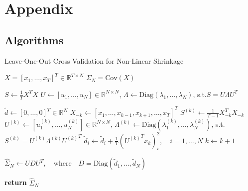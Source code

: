 \documentclass{article}
\begin{document}



\section{Appendix}

\subsection{Algorithms}


\begin{algorithm}
	\caption{Leave-One-Out Cross Validation for Non-Linear Shrinkage}
	\label{alg:nls_loo}
	\begin{algorithmic}[1]
	\Require $X = [x_1, \ldots, x_T]^T \in \mathbb{R}^{T\times N}$
	\Require $\Sigma_N = \mathrm{Cov}(X)$

		\State $S \gets \frac1T X^T X$
		\State 
				$U \gets [u_1, \ldots, u_N] \in \mathbb{R}^{N\times N}$,
				\quad $\Lambda \gets \mathrm{Diag}(\lambda_1, \ldots, \lambda_N)$,
				\quad \mbox{s.t.}\quad $S = U \Lambda {U}^T$

		\State $\tilde{d} \gets [0, \ldots, 0]^T \in \mathbb{R}^{N}$
			\State $X_{-k} \gets [x_1, \ldots, x_{k-1}, x_{k+1}, \ldots, x_T]^T$
			\State $S^{(k)} \gets \frac{1}{T-1} X_{-k}^T X_{-k} $
			\State 
				$U^{(k)} \gets [u^{(k)}_1, \ldots, u^{(k)}_N] \in \mathbb{R}^{N\times N}$,
				\quad $\Lambda^{(k)} 
					\gets \mathrm{Diag}(\lambda^{(k)}_1, \ldots, \lambda^{(k)}_N)$,
				\quad \mbox{s.t.}\quad $S^{(k)} = U^{(k)} \Lambda^{(k)} {U^{(k)}}^T$
			\State $\tilde{d}_i \gets \tilde{d}_i 
				+ \frac1T ({U^{(k)}}^T x_k)_i^2, \quad i = 1, \ldots, N$
			\State $k \gets k+1$
		\EndWhile

		\State $\hat{\Sigma}_N \gets UDU^T, \quad 
			\mbox{where}\quad D = \mathrm{Diag}(\tilde{d}_1, \ldots, \tilde{d}_N)$

		\State \textbf{return} $\hat{\Sigma}_N$ 
	\EndProcedure
	\end{algorithmic}
\end{algorithm}
\end{document}
